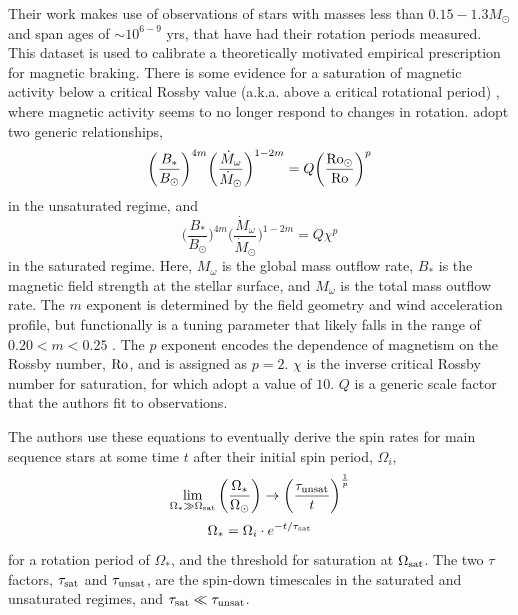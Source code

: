 Their work makes use of observations of stars with masses less than $0.15 - 1.3 M_\odot$ and span ages of $\sim 10^{6-9}$ yrs, that have had their rotation periods measured. This dataset is used to calibrate a theoretically motivated empirical prescription for magnetic braking. There is some evidence for a saturation of magnetic activity below a critical Rossby value (a.k.a. above a critical rotational period) \citep{reiners2009}, where magnetic activity seems to no longer respond to changes in rotation. \citet{matt2015} adopt two generic relationships, 
\begin{equation}
    \bigg(\frac{B_*}{B_\odot}\bigg)^{4m} \bigg(\frac{\dot M_\omega}{\dot M_\odot}\bigg)^{1-2m} = Q \bigg(\frac{\rm Ro_\odot}{\rm Ro} \bigg)^{p}
\end{equation}
in the unsaturated regime, and 
\begin{equation}
    \bigg(\frac{B_*}{B_\odot}\bigg)^{4m} \bigg(\frac{\dot M_\omega}{\dot M_\odot}\bigg)^{1-2m} = Q \chi^{p}
\end{equation}
in the saturated regime. Here, $M_\omega$ is the global mass outflow rate, $B_*$ is the magnetic field strength at the stellar surface, and $M_\omega$ is the total mass outflow rate. The $m$ exponent is determined by the field geometry and wind acceleration profile, but functionally is a tuning parameter that likely falls in the range of $0.20 < m < 0.25$ \citep{matt2015}. The $p$ exponent encodes the dependence of magnetism on the Rossby number, $\rm Ro$, and is assigned as $p = 2$. $\chi$ is the inverse critical Rossby number for saturation, for which \citet{matt2015} adopt a value of $10$. $Q$ is a generic scale factor that the authors fit to observations.

The authors use these equations to eventually derive the spin rates for main sequence stars at some time $t$ after their initial spin period, $\Omega_i$, 
\begin{equation}
    \lim_{\Omega_* \gg \Omega_{\rm sat}} \bigg(\frac{\Omega_*}{\Omega_\odot}\bigg) \rightarrow \bigg(\frac{\tau_{\rm unsat}}{t}\bigg)^{\frac{1}{p}}
\end{equation}
\begin{equation}
    \Omega_* = \Omega_i \cdot e^{-t/\tau_{\rm sat}}
\end{equation}
for a rotation period of $\Omega_*$, and the threshold for saturation at $\Omega_{\rm sat}$. The two $\tau$ factors, $\tau_{\rm sat}$ and $\tau_{\rm unsat}$, are the spin-down timescales in the saturated and unsaturated regimes, and $\tau_{\rm sat} \ll \tau_{\rm unsat}$.

